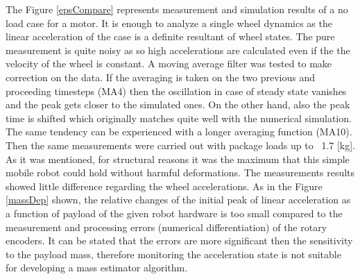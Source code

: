 \documentclass[12pt,english]{article}
\begin{document}
The Figure \ref{epsCompare} represents measurement and simulation results of a no load case for a motor. It is enough to analyze a single wheel dynamics as the linear acceleration of the case is a definite resultant of wheel states. The pure measurement is quite noisy as so high accelerations are calculated even if the the velocity of the wheel is constant. A moving average filter was tested to make correction on the data. If the averaging is taken on the two previous and proceeding timesteps (MA4) then the oscillation in case of steady state vanishes and the peak gets closer to the simulated ones. On the other hand, also the peak time is shifted which originally matches quite well with the numerical simulation. The same tendency can be experienced with a longer averaging function (MA10). Then the same measurements were carried out with package loads up to ~1.7 [kg]. As it was mentioned, for structural reasons it was the maximum that this simple mobile robot could hold without harmful deformations. The measurements results showed little difference regarding the wheel accelerations. As in the Figure \ref{massDep} shown, the relative changes of the initial peak of linear acceleration as a function of payload of the given robot hardware is too small compared to the measurement and processing errors (numerical differentiation) of the rotary encoders. It can be stated that the errors are more significant then the sensitivity to the payload mass, therefore monitoring the acceleration state is not suitable for developing a mass estimator algorithm. 
\end{document}
